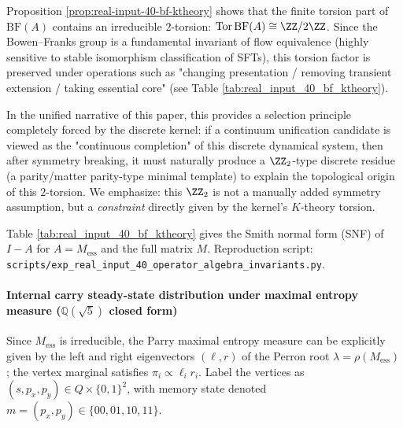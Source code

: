 \begin{remark}\label{rem:bf-z2-residual-gauge}
Proposition \ref{prop:real-input-40-bf-ktheory} shows that the finite torsion part of $\mathrm{BF}(A)$ contains an irreducible $2$-torsion:
\(
\mathrm{Tor}\,\mathrm{BF}(A)\cong \ZZ/2\ZZ
\).
Since the Bowen--Franks group is a fundamental invariant of flow equivalence (highly sensitive to stable isomorphism classification of SFTs), this torsion factor is preserved under operations such as "changing presentation / removing transient extension / taking essential core" (see Table \ref{tab:real_input_40_bf_ktheory}).
\par
In the unified narrative of this paper, this provides a selection principle completely forced by the discrete kernel: if a continuum unification candidate is viewed as the "continuous completion" of this discrete dynamical system, then after symmetry breaking, it must naturally produce a \(\ZZ_2\)-type discrete residue (a parity/matter parity-type minimal template) to explain the topological origin of this $2$-torsion.
We emphasize: this \(\ZZ_2\) is not a manually added symmetry assumption, but a \emph{constraint} directly given by the kernel's $K$-theory torsion.
\end{remark}

\begin{remark}\label{rem:real-input-40-bf-ktheory-repro}
Table \ref{tab:real_input_40_bf_ktheory} gives the Smith normal form (SNF) of $I-A$ for $A=M_{\mathrm{ess}}$ and the full matrix $M$.
Reproduction script: \texttt{scripts/exp\_real\_input\_40\_operator\_algebra\_invariants.py}.
\end{remark}


\paragraph{Internal carry steady-state distribution under maximal entropy measure (\texorpdfstring{$\mathbb Q(\sqrt5)$}{Q(sqrt5)} closed form)}
Since $M_{\mathrm{ess}}$ is irreducible, the Parry maximal entropy measure can be explicitly given by the left and right eigenvectors $(\ell,r)$ of the Perron root $\lambda=\rho(M_{\mathrm{ess}})$;
the vertex marginal satisfies $\pi_i\propto \ell_i r_i$.
Label the vertices as $(s,p_x,p_y)\in Q\times\{0,1\}^2$, with memory state denoted $m=(p_x,p_y)\in\{00,01,10,11\}$.

